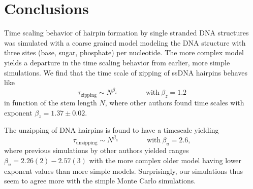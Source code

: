 \section{Conclusions}

Time scaling behavior of hairpin formation by single stranded DNA structures was simulated with a coarse grained model modeling the DNA structure with three sites (base, sugar, phosphate) per nucleotide. The more complex model yields a departure in the time scaling behavior from earlier, more simple simulations. We find that the time scale of zipping of ssDNA hairpins behaves like
\begin{equation}
\tau_\text{zipping} \sim N^{\beta_z} \qquad \qquad \text{with}\ \beta_z = 1.2
\end{equation}
in function of the stem length $N$, where other authors found time scales with exponent  $\beta_z = 1.37 \pm 0.02$.

The unzipping of DNA hairpins is found to have a timescale yielding
\begin{equation}
\tau_\text{unzipping} \sim N^{\beta_u} \qquad \qquad \text{with}\ \beta_u = 2.6,
\end{equation}
where previous simulations by other authors yielded ranges $\beta_u = 2.26(2) - 2.57(3)$ with the more complex older model having lower exponent values than more simple models. Surprisingly, our simulations thus seem to agree more with the simple Monte Carlo simulations.